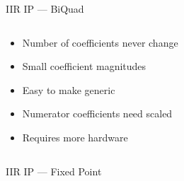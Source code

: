 \documentclass{beamer}
\begin{document}
\begin{frame}{IIR IP --- BiQuad}
  \begin{columns}[T]
    \begin{column}[T]{5cm}
      \begin{itemize}[<+>]
      \item Number of coefficients never change
      \item Small coefficient magnitudes
      \item Easy to make generic
      \end{itemize}
      \begin{itemize}[<+>]
      \item Numerator coefficients need scaled
      \item Requires more hardware
      \end{itemize}
    \end{column}
    \begin{column}[T]{5cm}
      \vfill
    \end{column}
  \end{columns}
\end{frame}
\begin{frame}{IIR IP --- Fixed Point}
\end{frame}
\end{document}
